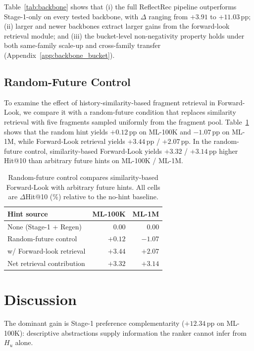 \documentclass[11pt]{article}
\begin{document}
Table~\ref{tab:backbone} shows that (i) the full ReflectRec pipeline outperforms Stage-1-only on every tested backbone, with $\Delta$ ranging from $+3.91$ to $+11.03$\,pp; (ii) larger and newer backbones extract larger gains from the forward-look retrieval module; and (iii) the bucket-level non-negativity property holds under both same-family scale-up and cross-family transfer (Appendix~\ref{app:backbone_bucket}).

\subsection{Random-Future Control}
\label{sec:control}

To examine the effect of history-similarity-based fragment retrieval in Forward-Look, we compare it with a random-future condition that replaces similarity retrieval with five fragments sampled uniformly from the fragment pool. Table~\ref{tab:random_ctrl} shows that the random hint yields $+0.12$\,pp on ML-100K and $-1.07$\,pp on ML-1M, while Forward-Look retrieval yields $+3.44$\,pp / $+2.07$\,pp. In the random-future control, similarity-based Forward-Look yields $+3.32$ / $+3.14$\,pp higher Hit@10 than arbitrary future hints on ML-100K / ML-1M.

\begin{table}[!t]
\centering
\small
\setlength{\tabcolsep}{8pt}
\begin{tabular}{lrr}
\toprule
\textbf{Hint source} & \textbf{ML-100K} & \textbf{ML-1M} \\
\midrule
None (Stage-1 + Regen)     & $0.00$  & $0.00$\\
Random-future control      & $+0.12$ & $-1.07$\\
\quad w/ Forward-look retrieval     & $+3.44$ & $+2.07$\\
\midrule
Net retrieval contribution & $+3.32$ & $+3.14$\\
\bottomrule
\end{tabular}
\caption{Random-future control compares similarity-based Forward-Look with arbitrary future hints. All cells are $\Delta$Hit@10 (\%) relative to the no-hint baseline.}
\label{tab:random_ctrl}
\end{table}

\section{Discussion}
\label{sec:discussion}

The dominant gain is Stage-1 preference complementarity ($+12.34$\,pp on ML-100K): descriptive abstractions supply information the ranker cannot infer from $H_u$ alone.
\end{document}
